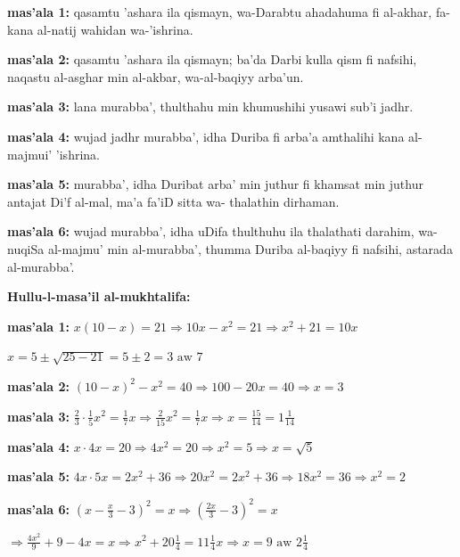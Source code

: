 \documentclass[11pt,a4paper]{book}
\begin{document}
\begin{originaltext}
\textbf{mas'ala 1:} qasamtu 'ashara ila qismayn, wa-Darabtu
ahadahuma fi al-akhar, fa-kana al-natij wahidan wa-'ishrina.

\textbf{mas'ala 2:} qasamtu 'ashara ila qismayn; ba'da Darbi kulla
qism fi nafsihi, naqastu al-asghar min al-akbar, wa-al-baqiyy
arba'un.

\textbf{mas'ala 3:} lana murabba', thulthahu min khumushihi yusawi
sub'i jadhr.

\textbf{mas'ala 4:} wujad jadhr murabba', idha Duriba fi arba'a
amthalihi kana al-majmui' 'ishrina.

\textbf{mas'ala 5:} murabba', idha Duribat arba' min juthur fi
khamsat min juthur antajat Di'f al-mal, ma'a fa'iD sitta wa-
thalathin dirhaman.

\textbf{mas'ala 6:} wujad murabba', idha uDifa thulthuhu ila
thalathati darahim, wa-nuqiSa al-majmu' min al-murabba', thumma
Duriba al-baqiyy fi nafsihi, astarada al-murabba'.
\end{originaltext}

\begin{mathexplain}
\textbf{Hullu-l-masa'il al-mukhtalifa:}

\textbf{mas'ala 1:} $x(10-x) = 21 \Rightarrow 10x - x^2 = 21 \Rightarrow x^2 + 21 = 10x$

$x = 5 \pm \sqrt{25 - 21} = 5 \pm 2 = 3 \text{ aw } 7$

\vspace{0.2cm}

\textbf{mas'ala 2:} $(10-x)^2 - x^2 = 40 \Rightarrow 100 - 20x = 40 \Rightarrow x = 3$

\vspace{0.2cm}

\textbf{mas'ala 3:} $\tfrac{2}{3} \cdot \tfrac{1}{5} x^2 = \tfrac{1}{7}x \Rightarrow \tfrac{2}{15}x^2 = \tfrac{1}{7}x \Rightarrow x = \tfrac{15}{14} = 1\tfrac{1}{14}$

\vspace{0.2cm}

\textbf{mas'ala 4:} $x \cdot 4x = 20 \Rightarrow 4x^2 = 20 \Rightarrow x^2 = 5 \Rightarrow x = \sqrt{5}$

\vspace{0.2cm}

\textbf{mas'ala 5:} $4x \cdot 5x = 2x^2 + 36 \Rightarrow 20x^2 = 2x^2 + 36 \Rightarrow 18x^2 = 36 \Rightarrow x^2 = 2$

\vspace{0.2cm}

\textbf{mas'ala 6:} $\left(x - \tfrac{x}{3} - 3\right)^2 = x \Rightarrow \left(\tfrac{2x}{3} - 3\right)^2 = x$

$\Rightarrow \tfrac{4x^2}{9} + 9 - 4x = x \Rightarrow x^2 + 20\tfrac{1}{4} = 11\tfrac{1}{4}x \Rightarrow x = 9 \text{ aw } 2\tfrac{1}{4}$
\end{mathexplain}
\end{document}
